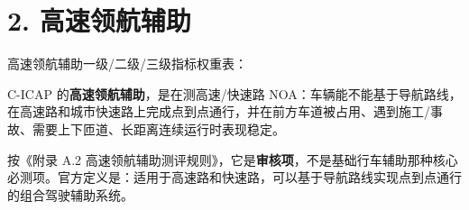 \section{2. 高速领航辅助}

高速领航辅助一级/二级/三级指标权重表：

C-ICAP 的\textbf{高速领航辅助}，是在测高速/快速路 NOA：车辆能不能基于导航路线，在高速路和城市快速路上完成点到点通行，并在前方车道被占用、遇到施工/事故、需要上下匝道、长距离连续运行时表现稳定。

按《附录 A.2 高速领航辅助测评规则》，它是\textbf{审核项}，不是基础行车辅助那种核心必测项。官方定义是：适用于高速路和快速路，可以基于导航路线实现点到点通行的组合驾驶辅助系统。
